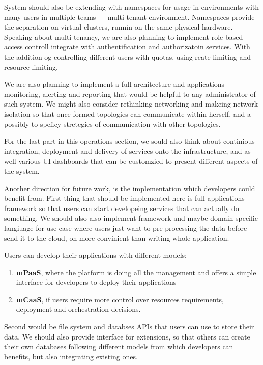 System should also be extending with namespaces for usage in environments with many users in multiple teams --- multi tenant environment. Namespaces provide the separation on virtual clusters, runnin on the same physical hardware. Speaking about multi tenancy, we are also planning to implement role-based access controll integrate with authentification and authorizatoin services. With the addition og controlling different users with quotas, using reate limiting and resource limiting.

We are also planning to implement a full architecture and applications monitoring, alerting and reporting that would be helpful to any administrator of such system. We might also consider rethinking networking and makeing network isolation so that once formed topologies can communicate within herself, and a possibly to speficy 
stretegies of communication with other topologies.
 
For the last part in this operations section, we sould also think about continious integration, deployment and delivery of services onto the infrastructure, and as well various UI dashboards that can be customzied to present different aspects of the system.

Another direction for future work, is the implementation which developers could benefit from. First thing that should be implemented here is full applications framework so that users can start developeing services that can actually do something. We should also also implement framework and maybe domain specific langiuage for use case where users just want to pre-processing the data before send it to the cloud, on more convinient than writing whole application.

Users can develop their applications with different models: 

\begin{enumerate}[start=1,label={(\bfseries \arabic*)}]
	\item \textbf{mPaaS}, where the platform is doing all the management and offers a simple interface for developers to deploy their applications
	\item \textbf{mCaaS}, if users require more control over resources requirements, deployment and orchestration decisions.
\end{enumerate}

Second would be file system and databses APIs that users can use to store their data. We should also provide interface for extensions, so that others can create their own databases following different models from which developers can benefits, but also integrating existing ones.

